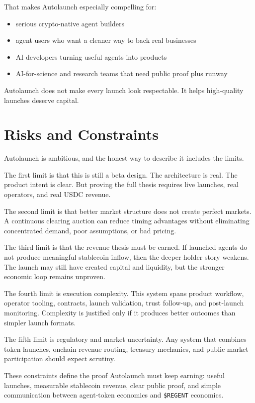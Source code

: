 \documentclass[11pt]{article}
\newcommand{\REGENT}{\texttt{\$REGENT}}
\newcommand{\USDC}{\textsc{USDC}}
\begin{document}
That makes Autolaunch especially compelling for:

\begin{itemize}[leftmargin=1.5em]
  \item serious crypto-native agent builders
  \item agent users who want a cleaner way to back real businesses
  \item AI developers turning useful agents into products
  \item AI-for-science and research teams that need public proof plus runway
\end{itemize}

Autolaunch does not make every launch look respectable. It helps high-quality launches deserve capital.

\section{Risks and Constraints}

Autolaunch is ambitious, and the honest way to describe it includes the limits.

The first limit is that this is still a beta design. The architecture is real. The product intent is clear. But proving the full thesis requires live launches, real operators, and real \USDC{} revenue.

The second limit is that better market structure does not create perfect markets. A continuous clearing auction can reduce timing advantages without eliminating concentrated demand, poor assumptions, or bad pricing.

The third limit is that the revenue thesis must be earned. If launched agents do not produce meaningful stablecoin inflow, then the deeper holder story weakens. The launch may still have created capital and liquidity, but the stronger economic loop remains unproven.

The fourth limit is execution complexity. This system spans product workflow, operator tooling, contracts, launch validation, trust follow-up, and post-launch monitoring. Complexity is justified only if it produces better outcomes than simpler launch formats.

The fifth limit is regulatory and market uncertainty. Any system that combines token launches, onchain revenue routing, treasury mechanics, and public market participation should expect scrutiny.

These constraints define the proof Autolaunch must keep earning: useful launches, measurable stablecoin revenue, clear public proof, and simple communication between agent-token economics and \REGENT{} economics.
\end{document}

